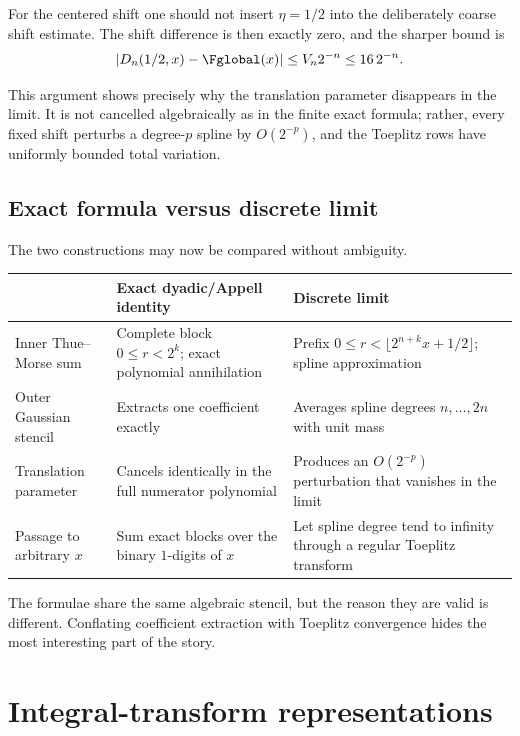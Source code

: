 \documentclass[11pt,oneside]{article}
\theoremstyle{definition}
\theoremstyle{remark}
\begin{document}
For the centered shift one should not insert $\eta=1/2$ into the deliberately
coarse shift estimate.  The shift difference is then exactly zero, and the
sharper bound is
\begin{equation}\label{dyadicq:eq:Dn-centered-rate}
 |D_n(1/2,x)-\Fglobal(x)|\le V_n2^{-n}\le16\,2^{-n}.
\end{equation}

This argument shows precisely why the translation parameter disappears in the
limit.  It is not cancelled algebraically as in the finite exact formula;
rather, every fixed shift perturbs a degree-$p$ spline by $O(2^{-p})$, and the
Toeplitz rows have uniformly bounded total variation.

\subsection{Exact formula versus discrete limit}

The two constructions may now be compared without ambiguity.

\begin{center}
\renewcommand{\arraystretch}{1.25}
\begin{tabularx}{0.94\textwidth}{>{\raggedright\arraybackslash}p{}XX}
\toprule
 & Exact dyadic/Appell identity & Discrete limit \\
\midrule
Inner Thue--Morse sum
 & Complete block $0\le r<2^k$; exact polynomial annihilation
 & Prefix $0\le r<\lfloor2^{n+k}x+1/2\rfloor$; spline approximation \\
Outer Gaussian stencil
 & Extracts one coefficient exactly
 & Averages spline degrees $n,\ldots,2n$ with unit mass \\
Translation parameter
 & Cancels identically in the full numerator polynomial
 & Produces an $O(2^{-p})$ perturbation that vanishes in the limit \\
Passage to arbitrary $x$
 & Sum exact blocks over the binary $1$-digits of $x$
 & Let spline degree tend to infinity through a regular Toeplitz transform \\
\bottomrule
\end{tabularx}
\end{center}

The formulae share the same algebraic stencil, but the reason they are valid is
different.  Conflating coefficient extraction with Toeplitz convergence hides
the most interesting part of the story.

\section{Integral-transform representations}
\end{document}
